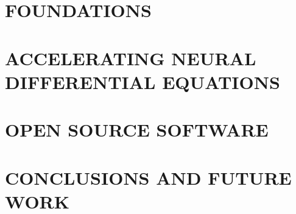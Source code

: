 \documentclass[11pt]{../common/thesis}
\begin{document}
\begin{frontmatter}
  \SgAddTitle%
  \SgAddToc%
  \SgAddLof%
  \SgAddLot%
  \SgAddLoa%
\end{frontmatter}



\part{FOUNDATIONS}
\label{part:foundations}


% 


\part{ACCELERATING NEURAL DIFFERENTIAL EQUATIONS}
\label{part:accelerating_nde}





\part{OPEN SOURCE SOFTWARE}
\label{part:open_source_software}


% 

\part{CONCLUSIONS AND FUTURE WORK}
\label{part:conclusion_and_future_work}




\end{document}
